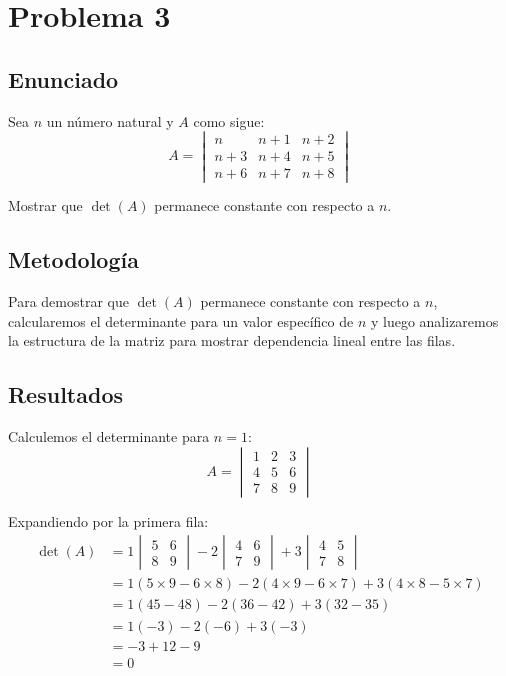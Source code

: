 \documentclass{article}
\begin{document}
\section{Problema 3}

\subsection{Enunciado}
Sea $n$ un número natural y $A$ como sigue:
$$A = \begin{vmatrix}
n & n+1 & n+2 \\
n+3 & n+4 & n+5 \\
n+6 & n+7 & n+8
\end{vmatrix}$$

Mostrar que $\det(A)$ permanece constante con respecto a $n$.

\subsection{Metodología}

Para demostrar que $\det(A)$ permanece constante con respecto a $n$, calcularemos el determinante para un valor específico de $n$ y luego analizaremos la estructura de la matriz para mostrar dependencia lineal entre las filas.

\subsection{Resultados}
\setcounter{equation}{0}

Calculemos el determinante para $n = 1$:
$$A = \begin{vmatrix}
1 & 2 & 3 \\
4 & 5 & 6 \\
7 & 8 & 9
\end{vmatrix}$$

Expandiendo por la primera fila:
\begin{align}
\det(A) &= 1 \begin{vmatrix} 5 & 6 \\ 8 & 9 \end{vmatrix} - 2 \begin{vmatrix} 4 & 6 \\ 7 & 9 \end{vmatrix} + 3 \begin{vmatrix} 4 & 5 \\ 7 & 8 \end{vmatrix} \\
&= 1 (5 \times 9 - 6 \times 8) - 2 (4 \times 9 - 6 \times 7) + 3 (4 \times 8 - 5 \times 7) \\
&= 1 (45 - 48) - 2 (36 - 42) + 3 (32 - 35) \\
&= 1 (-3) - 2 (-6) + 3 (-3) \\
&= -3 + 12 - 9 \\
&= 0
\end{align}
\end{document}
